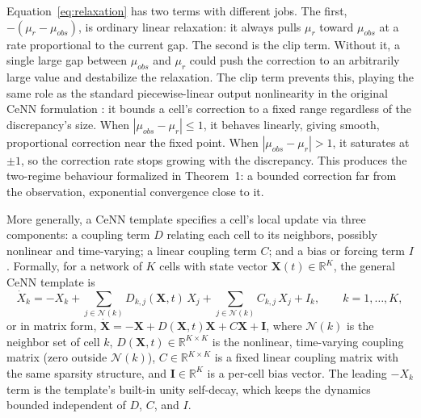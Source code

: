 \documentclass[final,5p,times,twocolumn,authoryear]{elsarticle}
\begin{document}
Equation~\eqref{eq:relaxation} has two terms with different jobs.
The first, $-(\mu_r-\mu_{obs})$, is ordinary linear relaxation:
it always pulls $\mu_r$ toward $\mu_{obs}$ at a rate proportional
to the current gap. The second is the clip term. Without it, a
single large gap between $\mu_{obs}$ and $\mu_r$ could push the
correction to an arbitrarily large value and destabilize the
relaxation. The clip term prevents this, playing the same role as
the standard piecewise-linear output nonlinearity in the original
CeNN formulation \citep{chua1988theory}: it bounds a cell's
correction to a fixed range regardless of the discrepancy's size.
When $|\mu_{obs}-\mu_r|\leq 1$, it behaves linearly, giving smooth,
proportional correction near the fixed point. When
$|\mu_{obs}-\mu_r|>1$, it saturates at $\pm1$, so the correction
rate stops growing with the discrepancy. This produces the
two-regime behaviour formalized in Theorem~1: a bounded correction
far from the observation, exponential convergence close to it.

More generally, a CeNN template specifies a cell's local update via
three components: a coupling term $D$ relating each cell to its
neighbors, possibly nonlinear and time-varying; a linear coupling
term $C$; and a bias or forcing term $I$. Formally, for a network of
$K$ cells with state vector $\mathbf{X}(t) \in \mathbb{R}^K$, the
general CeNN template is
\begin{equation}
\dot{X}_k = -X_k + \sum_{j \in \mathcal{N}(k)} D_{k,j}(\mathbf{X},t)\, X_j
+ \sum_{j \in \mathcal{N}(k)} C_{k,j}\, X_j + I_k, \qquad k=1,\dots,K,
\label{eq:cenn_template}
\end{equation}
or in matrix form, $\dot{\mathbf{X}} = -\mathbf{X} +
D(\mathbf{X},t)\mathbf{X} + C\mathbf{X} + \mathbf{I}$, where
$\mathcal{N}(k)$ is the neighbor set of cell $k$, $D(\mathbf{X},t)
\in \mathbb{R}^{K\times K}$ is the nonlinear, time-varying coupling
matrix (zero outside $\mathcal{N}(k)$), $C \in \mathbb{R}^{K\times
K}$ is a fixed linear coupling matrix with the same sparsity
structure, and $\mathbf{I} \in \mathbb{R}^K$ is a per-cell bias
vector. The leading $-X_k$ term is the template's built-in unity
self-decay, which keeps the dynamics bounded independent of $D$,
$C$, and $I$.
\end{document}
